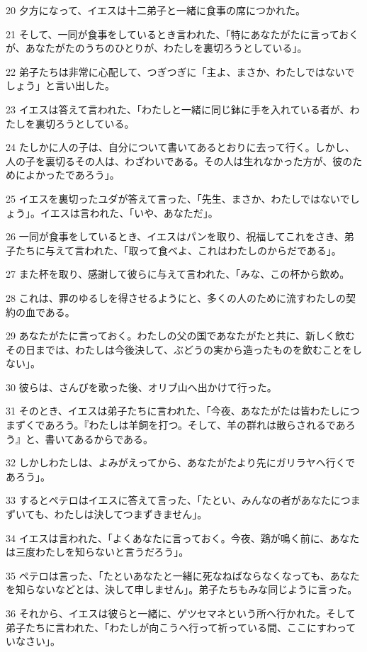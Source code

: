 \par 20 夕方になって、イエスは十二弟子と一緒に食事の席につかれた。
\par 21 そして、一同が食事をしているとき言われた、「特にあなたがたに言っておくが、あなたがたのうちのひとりが、わたしを裏切ろうとしている」。
\par 22 弟子たちは非常に心配して、つぎつぎに「主よ、まさか、わたしではないでしょう」と言い出した。
\par 23 イエスは答えて言われた、「わたしと一緒に同じ鉢に手を入れている者が、わたしを裏切ろうとしている。
\par 24 たしかに人の子は、自分について書いてあるとおりに去って行く。しかし、人の子を裏切るその人は、わざわいである。その人は生れなかった方が、彼のためによかったであろう」。
\par 25 イエスを裏切ったユダが答えて言った、「先生、まさか、わたしではないでしょう」。イエスは言われた、「いや、あなただ」。
\par 26 一同が食事をしているとき、イエスはパンを取り、祝福してこれをさき、弟子たちに与えて言われた、「取って食べよ、これはわたしのからだである」。
\par 27 また杯を取り、感謝して彼らに与えて言われた、「みな、この杯から飲め。
\par 28 これは、罪のゆるしを得させるようにと、多くの人のために流すわたしの契約の血である。
\par 29 あなたがたに言っておく。わたしの父の国であなたがたと共に、新しく飲むその日までは、わたしは今後決して、ぶどうの実から造ったものを飲むことをしない」。
\par 30 彼らは、さんびを歌った後、オリブ山へ出かけて行った。
\par 31 そのとき、イエスは弟子たちに言われた、「今夜、あなたがたは皆わたしにつまずくであろう。『わたしは羊飼を打つ。そして、羊の群れは散らされるであろう』と、書いてあるからである。
\par 32 しかしわたしは、よみがえってから、あなたがたより先にガリラヤへ行くであろう」。
\par 33 するとペテロはイエスに答えて言った、「たとい、みんなの者があなたにつまずいても、わたしは決してつまずきません」。
\par 34 イエスは言われた、「よくあなたに言っておく。今夜、鶏が鳴く前に、あなたは三度わたしを知らないと言うだろう」。
\par 35 ペテロは言った、「たといあなたと一緒に死なねばならなくなっても、あなたを知らないなどとは、決して申しません」。弟子たちもみな同じように言った。
\par 36 それから、イエスは彼らと一緒に、ゲツセマネという所へ行かれた。そして弟子たちに言われた、「わたしが向こうへ行って祈っている間、ここにすわっていなさい」。
